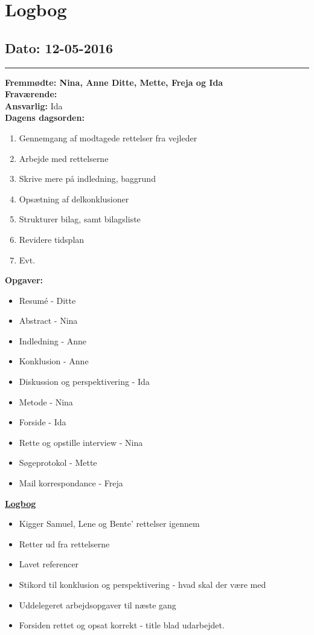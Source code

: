 \chapter{Logbog}
\section{Dato: 12-05-2016}
\hrule
\textbf{Fremmødte: Nina, Anne Ditte, Mette, Freja og Ida} \\
\textbf{Fraværende: } \\
\textbf{Ansvarlig: } Ida  \\
\textbf{Dagens dagsorden: }
\begin{enumerate}
\item Gennemgang af modtagede rettelser fra vejleder
\item Arbejde med rettelserne
\item Skrive mere på indledning, baggrund
\item Opsætning af delkonklusioner
\item Strukturer bilag, samt bilagsliste
\item Revidere tidsplan
\item Evt. 
\end{enumerate}
\textbf{Opgaver: }
\begin{itemize}
\item Resumé - Ditte
\item Abstract - Nina
\item Indledning - Anne
\item Konklusion - Anne
\item Diskussion og perspektivering - Ida
\item Metode - Nina
\item Forside - Ida
\item Rette og opstille interview - Nina
\item Søgeprotokol - Mette
\item Mail korrespondance - Freja
\end{itemize}
\underline{\textbf{Logbog}}\\
\begin{itemize}
\item Kigger Samuel, Lene og Bente' rettelser igennem
\item Retter ud fra rettelserne
\item Lavet referencer
\item Stikord til konklusion og perspektivering - hvad skal der være med
\item Uddelegeret arbejdsopgaver til næste gang
\item Forsiden rettet og opsat korrekt - title blad udarbejdet.
\end{itemize}